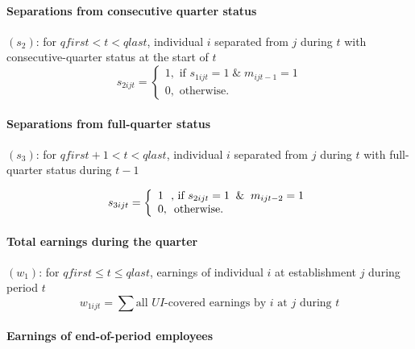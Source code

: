 \paragraph{Separations from consecutive quarter status}


$\left( s_{2}\right) $: for $qfirst<t<qlast$, individual $i$ separated from $%
j$ during $t$ with consecutive-quarter status at the start of $t$%
\begin{equation}
s_{2ijt}=\left\{ 
\begin{array}{l}
1,\text{ if }s_{1ijt}=1\;\&\;m_{ijt-1}=1 \\ 
0,\text{ otherwise.}%
\end{array}%
\right.  \label{eq:s2ijt}
\end{equation}

\paragraph{Separations from full-quarter status}


$\left( s_{3}\right) $: for $qfirst+1<t<qlast$, individual $i$ separated
from $j$ during $t$ with full-quarter status during $t-1$

\begin{equation}
s_{3ijt}=\left\{ 
\begin{array}{l}
{1}\text{, if }{s_{2ijt}=1\And m_{ijt-2}=1} \\ 
{0,}\text{otherwise.}%
\end{array}%
\right.  \label{eq:s3ijt}
\end{equation}

\paragraph{Total earnings during the quarter}


$\left( w_{1}\right) $: for $qfirst\leq t\leq qlast$, earnings of individual 
$i$ at establishment $j$ during period $t$%
\begin{equation}
w_{1ijt}=\sum \text{{all }}{UI}\text{-covered earnings by }{i}\text{ at }{j}%
\text{ during }{t}
\end{equation}

\paragraph{Earnings of end-of-period employees}

